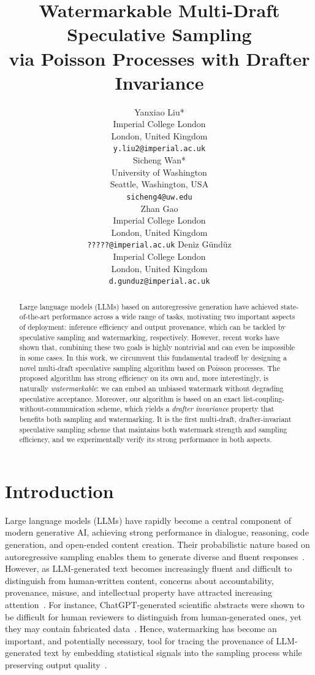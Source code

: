 \documentclass{article}
\title{Watermarkable Multi-Draft Speculative Sampling \\
via Poisson Processes with Drafter Invariance}
\author{
  Yanxiao Liu*
    \\ 
  Imperial College London\\
  London, United Kingdom \\
  \texttt{y.liu2@imperial.ac.uk} \\
  \And
  Sicheng Wan* \\
  University of Washington \\
  Seattle, Washington, USA \\
  \texttt{sicheng4@uw.edu} \\
  \And
  Zhan Gao \\
  Imperial College London\\
  London, United Kingdom \\
 \texttt{?????@imperial.ac.uk} 
  \AND
  Deniz G\"und\"uz \\
  Imperial College London\\
  London, United Kingdom \\
  \texttt{d.gunduz@imperial.ac.uk} \\
}
\theoremstyle{plain}
\theoremstyle{definition}
\begin{document}
\maketitle


\begin{abstract}
Large language models (LLMs) based on autoregressive generation have achieved state-of-the-art performance across a wide range of tasks, motivating two important aspects of deployment: inference efficiency and output provenance, which can be %
tackled by speculative sampling and watermarking, respectively.
However, recent works have shown that, combining these two goals is highly nontrivial and can even be impossible in some cases. 
In this work, we circumvent this fundamental tradeoff by designing a novel multi-draft speculative sampling algorithm based on Poisson processes. 
The proposed %
algorithm has strong efficiency on its own and, more interestingly, is naturally \emph{watermarkable}: we can embed an unbiased watermark without degrading speculative acceptance. 
Moreover, our algorithm %
is based on an exact list-coupling-without-communication scheme, which yields a \emph{drafter invariance} property that benefits both sampling and watermarking.
It is the first multi-draft, drafter-invariant speculative sampling scheme that maintains both watermark strength and sampling efficiency, and we experimentally verify its strong performance in both aspects.
\end{abstract}


\section{Introduction}
\label{sec::intro}
\vspace{-2pt}

Large language models (LLMs) have rapidly become a central component of modern generative AI, achieving strong performance in dialogue, reasoning, code generation, and open-ended content creation. Their probabilistic nature based on autoregressive sampling enables them to generate diverse and fluent responses~\citep{brown2020language, chowdhery2023palm, touvron2023llama, ouyang2022training, achiam2023gpt}. 
However, as LLM-generated text becomes increasingly fluent and difficult to distinguish from human-written content, concerns about accountability, provenance, misuse, and intellectual property have attracted increasing attention~\citep{wu2025survey}. 
For instance, ChatGPT-generated scientific abstracts were shown to be difficult for human reviewers to distinguish from human-generated ones, yet they may contain fabricated data~\citep{gao2023comparing, shumailov2024ai}. %
Hence, watermarking has become an important, and potentially necessary, tool for tracing the provenance of LLM-generated text by embedding statistical signals into the sampling process while preserving output quality~\citep{kirchenbauer2023watermark, aaronson2023watermarking, kuditipudi2023robust}. 
\end{document}
